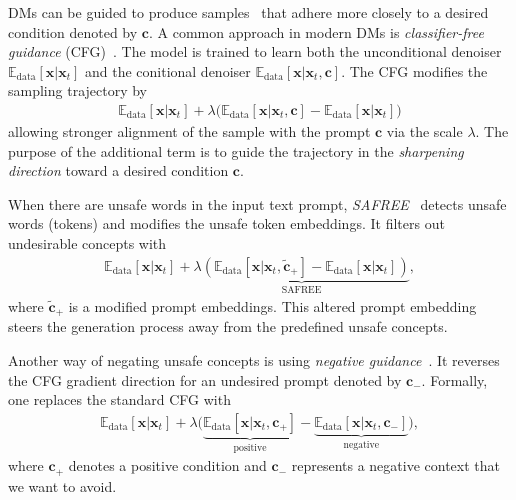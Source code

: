 DMs can be guided to produce samples~\cite{dhariwal2021diffusion,kim2022refining} that adhere more closely to a desired condition denoted by $\mathbf{c}$. A common approach in modern DMs is \textit{classifier-free guidance} (CFG)~\cite{ho2021classifier}. The model is trained to learn both the unconditional denoiser $\mathbb{E}_{\text{data}}[\mathbf{x}\vert\mathbf{x}_{t}]$ and the conitional denoiser $\mathbb{E}_{\text{data}}[\mathbf{x}\vert\mathbf{x}_{t},\mathbf{c}]$. The CFG modifies the sampling trajectory by
\begin{align*}
%
    \mathbb{E}_{\text{data}}[\mathbf{x}\vert\mathbf{x}_{t}]+\lambda\big(\mathbb{E}_{\text{data}}[\mathbf{x}\vert\mathbf{x}_{t},\mathbf{c}]-\mathbb{E}_{\text{data}}[\mathbf{x}\vert\mathbf{x}_{t}]\big)
\end{align*} %
allowing stronger alignment of the sample with the prompt $\mathbf{c}$ via the scale $\lambda$. The purpose of the additional term is to guide the trajectory in the \textit{sharpening direction} toward a desired condition $\mathbf{c}$.

When there are unsafe words in the input text prompt, \textit{SAFREE}~\citep{yoon2024safree} detects unsafe words (tokens) and modifies the unsafe token embeddings. It filters out undesirable concepts with
\begin{align}\label{eq:SAFREE}
    \mathbb{E}_{\text{data}}[\mathbf{x}\vert\mathbf{x}_{t}]+\underbrace{\lambda(\mathbb{E}_{\text{data}}[\mathbf{x}\vert\mathbf{x}_{t},\tilde{\mathbf{c}}_{+}]-\mathbb{E}_{\text{data}}[\mathbf{x}\vert\mathbf{x}_{t}])}_{\text{SAFREE}},
\end{align}
where $\tilde{\mathbf{c}}_{+}$ is a modified prompt embeddings. This altered prompt embedding steers the generation process away from the predefined unsafe concepts.

Another way of negating unsafe concepts is using \textit{negative guidance}~\cite{liu2022compositional}. It reverses the CFG gradient direction for an undesired prompt denoted by $\mathbf{c}_{-}$. 
Formally, one replaces the standard CFG with
\begin{align*}
    \mathbb{E}_{\text{data}}[\mathbf{x}\vert\mathbf{x}_{t}]+\lambda\big(\underbrace{\mathbb{E}_{\text{data}}[\mathbf{x}\vert\mathbf{x}_{t},\mathbf{c}_{+}]}_{\text{positive}}-\underbrace{\mathbb{E}_{\text{data}}[\mathbf{x}\vert\mathbf{x}_{t},\mathbf{c}_{-}]}_{\text{negative}}\big),
\end{align*}
where $\mathbf{c}_{+}$ denotes a positive condition and $\mathbf{c}_{-}$ represents a negative context that we want to avoid.

